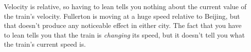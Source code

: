 Velocity is relative, so having to lean tells you nothing
about the current value of the train's velocity.  Fullerton is moving at a huge
speed relative to Beijing, but that doesn't produce any
noticeable effect in either city.  The fact that you have to
lean tells you that the train is \emph{changing} its speed,
but it doesn't tell you what the train's current speed is.
